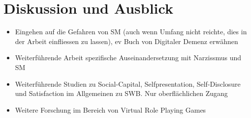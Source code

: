 %
%

\chapter{Diskussion und Ausblick}\label{chap.diskussion}

\begin{itemize}
\item Eingehen auf die Gefahren von SM (auch wenn Umfang nicht reichte, dies in der Arbeit einfliessen zu lassen), ev Buch von Digitaler Demenz erwähnen
\item Weiterführende Arbeit spezifische Auseinandersetzung mit Narzissmus und SM
\item Weiterführende Studien zu Social-Capital, Selfpresentation, Self-Disclosure und Satisfaction im Allgemeinen zu SWB. Nur oberflächlichen Zugang
\item Weitere Forschung im Bereich von Virtual Role Playing Games
\end{itemize}
